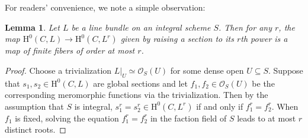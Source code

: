 \documentclass[11pt, letterpaper]{amsart}
\theoremstyle{plain}
\newtheorem{lemma}[theorem]{Lemma}
\theoremstyle{definition}
\newcommand{\<}{\langle}
\renewcommand{\>}{\rangle}
\newcommand{\sO}{\mathcal{O}}
\renewcommand{\H}{\mathrm{H}}
\begin{document}
For readers' convenience, we note a simple observation:
\begin{lemma}
\label{lem: power map fin fibers}
    Let $L$ be a line bundle on an integral scheme $S$. 
    Then for any $r$, the map $\H^0(C, L) \to \H^0(C, L^r)$ given by raising a section to its $r$th power is a map of finite fibers of order at most $r$. 
\end{lemma}
\begin{proof}
    Choose a trivialization $L|_U \simeq \sO_S(U)$ for some dense open $U \subseteq S$. Suppose that $s_1, s_2 \in \H^0(C, L)$ are global sections and let $f_1, f_2 \in \sO_S(U)$ be the corresponding meromorphic functions via the trivialization. 
    Then by the assumption that $S$ is integral, $s_1^r = s_2^r \in \H^0(C, L^r)$ if and only if $f_1^r = f_2^r$. When $f_1$ is fixed, solving the equation $f_1^r = f_2^r$ in the faction field of $S$ leads to at most $r$ distinct roots. 
\end{proof}
\end{document}
